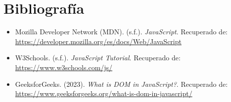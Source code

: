 \documentclass[11pt]{scrartcl}
\begin{document}
\section{Bibliografía}
\begin{itemize}
    \item Mozilla Developer Network (MDN). (s.f.). \textit{JavaScript}. Recuperado de: \url{https://developer.mozilla.org/es/docs/Web/JavaScript}
    \item W3Schools. (s.f.). \textit{JavaScript Tutorial}. Recuperado de: \url{https://www.w3schools.com/js/}
    \item GeeksforGeeks. (2023). \textit{What is DOM in JavaScript?}. Recuperado de: \url{https://www.geeksforgeeks.org/what-is-dom-in-javascript/}
\end{itemize}
\end{document}
